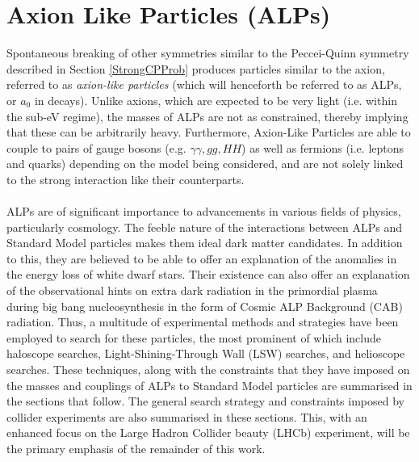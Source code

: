 \section{Axion Like Particles (ALPs)}
Spontaneous breaking of other symmetries similar to the Peccei-Quinn symmetry described in Section \ref{StrongCPProb} produces particles similar to the axion, referred to as \textit{axion-like particles} (which will henceforth be referred to as ALPs, or $a_{0}$ in decays). Unlike axions, which are expected to be very light (i.e. within the sub-eV regime), the masses of ALPs 
are not as constrained, thereby implying that these can be arbitrarily heavy. Furthermore, Axion-Like Particles are able to couple to pairs of
gauge bosons (e.g. $\gamma\gamma, gg, HH$) as well as fermions (i.e. leptons and quarks) depending on the model being considered, and are not solely linked to the strong interaction like their
counterparts. \\
\\
ALPs are of significant importance to advancements in various fields of physics, particularly cosmology. The feeble nature of the interactions between ALPs and Standard Model particles makes them ideal dark matter candidates. In addition to this, they
are believed to be able to offer an explanation of the anomalies in the energy loss of white dwarf stars. Their existence can also offer an explanation of the observational hints on extra dark radiation in the primordial plasma during big bang nucleosynthesis in the form
of Cosmic ALP Background (CAB) radiation. Thus, a multitude of experimental methods and strategies have been employed to search for these particles, the most prominent of which include haloscope searches, Light-Shining-Through Wall (LSW) searches, and helioscope searches. These
techniques, along with the constraints that they have imposed on the masses and couplings of ALPs to Standard Model particles are summarised in the sections that follow. The general search strategy and constraints imposed by collider experiments are also summarised in these sections. This, with an enhanced focus on the Large Hadron Collider beauty (LHCb) experiment,
will be the primary emphasis of the remainder of this work. 
